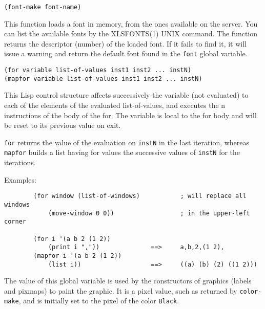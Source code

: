         
{\usagefont\begin{verbatim}
(font-make font-name)
\end{verbatim}}\usageupspace

This function loads a font in memory, from the ones available on the server.
You can list the available fonts by the XLSFONTS(1) UNIX command. The function
returns the descriptor (number) of the loaded font. If it fails to find it,
it will issue a warning and return the default font found in the \verb"font"
global variable.

        
{\usagefont\begin{verbatim}
(for variable list-of-values inst1 inst2 ... instN)
(mapfor variable list-of-values inst1 inst2 ... instN)
\end{verbatim}}\usageupspace

This Lisp control structure affects successively the variable (not
evaluated) to each of the elements  of the evaluated list-of-values, and
executes the n instructions of the body of the for.  The variable is local
to the for body and will be reset to its previous value on exit.

\verb"for"  returns the value of the evaluation on \verb"instN" in
the last iteration, whereas \verb"mapfor" builds a list having for
values the successive values of \verb"instN" for the iterations.

Examples:{\exemplefont\upspace\begin{verbatim}
        (for window (list-of-windows)           ; will replace all windows
            (move-window 0 0))                  ; in the upper-left corner

        (for i '(a b 2 (1 2)) 
            (print i ","))              ==>     a,b,2,(1 2),
        (mapfor i '(a b 2 (1 2))
            (list i))                   ==>     ((a) (b) (2) ((1 2)))
\end{verbatim}}

        

The value of this global variable is used by the constructors of graphics
(labels and pixmaps) to paint the graphic. It is a pixel value, such as
returned by \verb"color-make", and is initially set to the pixel of the color
\verb"Black".


